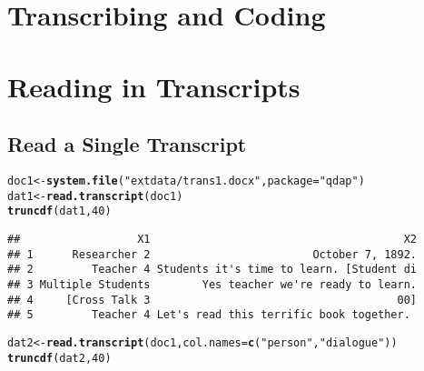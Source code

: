 \documentclass[a4paper]{article}\usepackage{graphicx, color}
\makeatletter
\newcommand{\hlfunctioncall}[1]{\textcolor[rgb]{0.501960784313725,0,0.329411764705882}{\textbf{#1}}}%
\newcommand{\hlstring}[1]{\textcolor[rgb]{0.6,0.6,1}{#1}}%
\newenvironment{kframe}{%
 \def\at@end@of@kframe{}%
 \ifinner\ifhmode%
  \def\at@end@of@kframe{\end{minipage}}%
  \begin{minipage}{\columnwidth}%
 \fi\fi%
 \def\FrameCommand##1{\hskip\@totalleftmargin \hskip-\fboxsep
 \colorbox{shadecolor}{##1}\hskip-\fboxsep
     \hskip-\linewidth \hskip-\@totalleftmargin \hskip\columnwidth}%
 \MakeFramed {\advance\hsize-\width
   \@totalleftmargin\z@ \linewidth\hsize
   \@setminipage}}%
 {\par\unskip\endMakeFramed%
 \at@end@of@kframe}
\newenvironment{knitrout}{}{} %
\makeatother
\begin{document}
\section*{Transcribing and Coding}
\section*{Reading in Transcripts}

\subsection*{Read a Single Transcript}
\begin{knitrout}
\color{fgcolor}\begin{kframe}
\begin{alltt}
doc1 <- \hlfunctioncall{system.file}(\hlstring{"extdata/trans1.docx"}, package = \hlstring{"qdap"})
dat1 <- \hlfunctioncall{read.transcript}(doc1)
\hlfunctioncall{truncdf}(dat1, 40)
\end{alltt}
\end{kframe}
\end{knitrout}


\begin{knitrout}
\color{fgcolor}\begin{kframe}
\begin{verbatim}
##                  X1                                       X2
## 1      Researcher 2                         October 7, 1892.
## 2         Teacher 4 Students it's time to learn. [Student di
## 3 Multiple Students        Yes teacher we're ready to learn.
## 4     [Cross Talk 3                                      00]
## 5         Teacher 4 Let's read this terrific book together.
\end{verbatim}
\end{kframe}
\end{knitrout}


\begin{knitrout}
\color{fgcolor}\begin{kframe}
\begin{alltt}
dat2 <- \hlfunctioncall{read.transcript}(doc1, col.names = \hlfunctioncall{c}(\hlstring{"person"}, \hlstring{"dialogue"}))
\hlfunctioncall{truncdf}(dat2, 40)
\end{alltt}
\end{kframe}
\end{knitrout}
\end{document}
